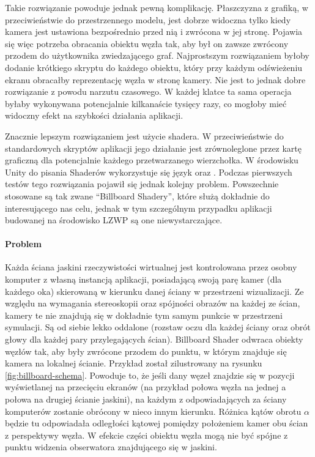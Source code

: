 
Takie rozwiązanie powoduje jednak pewną komplikację. Płaszczyzna z grafiką, w przeciwieństwie do przestrzennego modelu, jest dobrze widoczna tylko kiedy kamera jest ustawiona bezpośrednio przed nią i zwrócona w jej stronę. Pojawia się więc potrzeba obracania obiektu węzła tak, aby był on zawsze zwrócony przodem do użytkownika zwiedzającego graf. Najprostszym rozwiązaniem byłoby dodanie krótkiego skryptu do każdego obiektu, który przy każdym odświeżeniu ekranu obracałby reprezentację węzła w stronę kamery. Nie jest to jednak dobre rozwiązanie z powodu narzutu czasowego. W każdej klatce ta sama operacja byłaby wykonywana potencjalnie kilkanaście tysięcy razy, co mogłoby mieć widoczny efekt na szybkości działania aplikacji.

Znacznie lepszym rozwiązaniem jest użycie shadera. W przeciwieństwie do standardowych skryptów aplikacji jego działanie jest zrównoleglone przez kartę graficzną dla potencjalnie każdego przetwarzanego wierzchołka. W środowisku Unity do pisania Shaderów wykorzystuje się język  oraz  \cite{UnityShaders}. Podczas pierwszych testów tego rozwiązania pojawił się jednak kolejny problem. Powszechnie stosowane są tak zwane ``Billboard Shadery'', które służą dokładnie do interesującego nas celu, jednak w tym szczególnym przypadku aplikacji budowanej na środowisko LZWP są one niewystarczające. 

\paragraph{Problem} Każda ściana jaskini rzeczywistości wirtualnej jest kontrolowana przez osobny komputer z własną instancją aplikacji, posiadającą swoją parę kamer (dla każdego oka) skierowaną w kierunku danej ściany w przestrzeni wizualizacji. Ze względu na wymagania stereoskopii oraz spójności obrazów na każdej ze ścian, kamery te nie znajdują się w dokładnie tym samym punkcie w przestrzeni symulacji. Są od siebie lekko oddalone (rozstaw oczu dla każdej ściany oraz obrót głowy dla każdej pary przylegających ścian). Billboard Shader odwraca obiekty węzłów tak, aby były zwrócone przodem do punktu, w którym znajduje się kamera na lokalnej ścianie. Przykład został zilustrowany na rysunku \ref{fig:billboard-schema}. Powoduje to, że jeśli dany węzeł znajdzie się w pozycji wyświetlanej na przecięciu ekranów (na przykład połowa węzła na jednej a połowa na drugiej ścianie jaskini), na każdym z odpowiadających za ściany komputerów zostanie obrócony w nieco innym kierunku. Różnica kątów obrotu \(\alpha\) będzie tu odpowiadała odległości kątowej pomiędzy położeniem kamer obu ścian z perspektywy węzła. W efekcie części obiektu węzła mogą nie być spójne z punktu widzenia obserwatora znajdującego się w jaskini.

